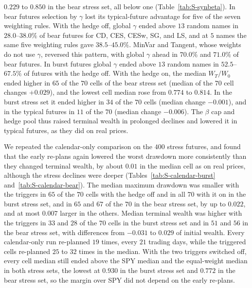 $0.229$ to $0.850$ in the bear stress set, all below one (Table~\ref{tab:S-synbeta}).
In bear futures selection by $\gamma$ lost its typical-future advantage for five of the seven weighting rules. With
the hedge off, global $\gamma$ ended above $13$ random names in $28.0$--$38.0\%$ of bear futures for CD, CES, CESw,
SG, and LS, and at $5$ names the same five weighting rules gave $38.5$--$45.0\%$. MinVar and Tangent, whose weights do
not use $\gamma$, reversed this pattern, with global $\gamma$ ahead in $70.0\%$ and $71.0\%$ of bear futures. In
burst futures global $\gamma$ ended above $13$ random names in $52.5$--$67.5\%$ of futures with the hedge off.
With the hedge on, the median $W_T/W_0$ ended higher in $65$ of the $70$ cells of the bear stress set (median of the
$70$ cell changes $+0.029$), and the lowest cell median rose from $0.774$ to $0.814$. In the burst stress set it
ended higher in $34$ of the $70$ cells (median change $-0.001$), and in the typical futures in $11$ of the $70$
(median change $-0.006$). The $\beta$ cap and hedge pool thus raised terminal wealth in prolonged declines and
lowered it in typical futures, as they did on real prices.

We repeated the calendar-only comparison on the $400$ stress futures, and found that the early re-plans again lowered
the worst drawdown more consistently than they changed terminal wealth, by about $0.01$ in the median cell as on real
prices, although the stress declines were deeper (Tables~\ref{tab:S-calendar-burst} and~\ref{tab:S-calendar-bear}).
The median maximum drawdown was smaller with the triggers in $65$ of the $70$ cells with the hedge off and in all $70$
with it on in the burst stress set, and in $65$ and $67$ of the $70$ in the bear stress set, by up to $0.022$, and at
most $0.007$ larger in the others. Median terminal wealth was higher with the triggers in $33$ and $28$ of the $70$
cells in the burst stress set and in $51$ and $56$ in the bear stress set, with differences from $-0.031$ to $0.029$
of initial wealth. Every calendar-only run re-planned $19$ times, every $21$ trading days, while the triggered cells
re-planned $25$ to $32$ times in the median. With the two triggers switched off, every cell median still ended above
the SPY median and the equal-weight median in both stress sets, the lowest at $0.930$ in the burst stress set and
$0.772$ in the bear stress set, so the margin over SPY did not depend on the early re-plans.

